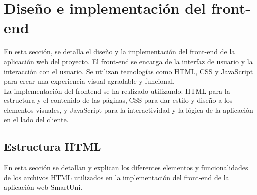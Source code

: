 \documentclass[12pt]{report}
\begin{document}
\chapter{Diseño e implementación del front-end}
En esta sección, se detalla el diseño y la implementación del front-end de la aplicación web del proyecto. El front-end se encarga de la interfaz de usuario y la interacción con el usuario. Se utilizan tecnologías como HTML, CSS y JavaScript para crear una experiencia visual agradable y funcional. \\
La implementación del front\textendash end se ha realizado utilizando: HTML para la estructura y el contenido de las páginas, CSS para dar estilo y diseño a los elementos visuales, y JavaScript para la interactividad y la lógica de la aplicación en el lado del cliente.
\\

\section{Estructura HTML}
En esta sección se detallan y explican los diferentes elementos y funcionalidades de los archivos HTML utilizados en la implementación del front-end de la aplicación web SmartUni.
\end{document}
